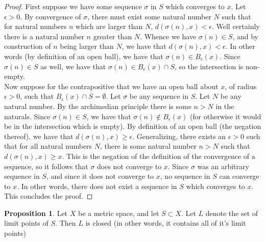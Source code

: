\documentclass[11pt]{article}
\theoremstyle{definition}
\newtheorem{proposition}{Proposition}
\begin{document}
\begin{proof}
First suppose we have some sequence $\sigma$ in $S$ which converges to $x$. Let $\epsilon > 0$. By convergence of $\sigma$, there must exist some natural number $N$ such that for natural numbers $n$ which are larger than $N$, $ d(\sigma(n) , x) < \epsilon $. Well certainly there is a natural number $n$ greater than $N$. Whence we have $\sigma(n)\in S$, and by construction of $n$ being larger than $N$, we have that $d(\sigma(n) , x) < \epsilon$. In other words (by definition of an open ball), we have that $\sigma(n)\in B_\epsilon(x)$. Since $\sigma(n)\in S$ as well, we have that $\sigma(n)\in B_\epsilon(x)\cap S$, so the intersection is non-empty.\\


Now suppose for the contrapositive that we have an open ball about $x$, of radius $\epsilon > 0$, such that $B_\epsilon(x) \cap S = \emptyset$. Let $\sigma$ be any sequence in $S$. Let $N$ be any natural number. By the archimedian principle there is some $n> N$ in the naturals. Since $\sigma(n)\in S$, we have that $\sigma(n) \not\in B_\epsilon(x)$ (for otherwise it would be in the intersection which is empty). By definition of an open ball (the negation thereof), we have that $d(\sigma(n), x) \ge \epsilon$. Generalizing, there exists an $\epsilon> 0$ such that for all natural numbers $N$, there is some natural number $n > N$ such that $ d(\sigma(n), x) \ge x $. This is the negation of the definition of the convergence of a sequence, so it follows that $\sigma$ does not converge to $x$. Since $\sigma$ was an arbitrary sequence in $S$, and since it does not converge to $x$, no sequence in $S$ can converge to $x$. In other words, there does not exist a sequence in $S$ which converges to $x$. This concludes the proof.
\end{proof}

\begin{proposition}
Let $X$ be a metric space, and let $S\subset X$. Let $L$ denote the set of limit points of $S$. Then $L$ is closed (in other words, it contains all of it's limit points)
\end{proposition}
\end{document}
